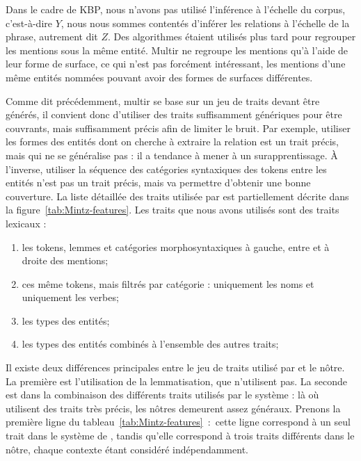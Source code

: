 \documentclass[12pt,a4paper,times,twoside,openright]{report}
\begin{document}
Dans le cadre de KBP, nous n'avons pas utilisé l'inférence à l'échelle du corpus, c'est-à-dire $Y$, nous nous sommes contentés d'inférer les relations à l'échelle de la phrase, autrement dit $Z$. Des algorithmes étaient utilisés plus tard pour regrouper les mentions sous la même entité. Multir ne regroupe les mentions qu'à l'aide de leur forme de surface, ce qui n'est pas forcément intéressant, les mentions d'une même entités nommées pouvant avoir des formes de surfaces différentes.


Comme dit précédemment, multir se base sur un jeu de traits devant être générés, il convient donc d'utiliser des traits suffisamment génériques pour être couvrants, mais suffisamment précis afin de limiter le bruit. Par exemple, utiliser les formes des entités dont on cherche à extraire la relation est un trait précis, mais qui ne se généralise pas : il a tendance à mener à un surapprentissage. À l'inverse, utiliser la séquence des catégories syntaxiques des tokens entre les entités n'est pas un trait précis, mais va permettre d'obtenir une bonne couverture. La liste détaillée des traits utilisée par \citet{mintz2009distant} est partiellement décrite dans la figure\ \ref{tab:Mintz-features}. Les traits que nous avons utilisés sont des traits lexicaux :
\begin{enumerate}
    \item les tokens, lemmes et catégories morphosyntaxiques à gauche, entre et à droite des mentions;
    \item ces même tokens, mais filtrés par catégorie : uniquement les noms et uniquement les verbes;
    \item les types des entités;
    \item les types des entités combinés à l'ensemble des autres traits;
\end{enumerate}

Il existe deux différences principales entre le jeu de traits utilisé par \citet{mintz2009distant} et le nôtre. La première est l'utilisation de la lemmatisation, que \citet{mintz2009distant} n'utilisent pas. La seconde est dans la combinaison des différents traits utilisés par le système : là où \citet{mintz2009distant} utilisent des traits très précis, les nôtres demeurent assez généraux. Prenons la première ligne du tableau\ \ref{tab:Mintz-features}\ :\ cette ligne correspond à un seul trait dans le système de \citet{mintz2009distant}, tandis qu'elle correspond à trois traits différents dans le nôtre, chaque contexte étant considéré indépendamment.
\end{document}
